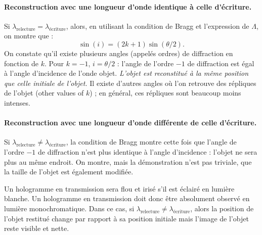 \paragraph{Reconstruction avec une longueur d'onde identique à celle d'écriture.}
Si $\lambda_{\text{relecture}}=\lambda_{\text{écriture}}$, alors, en utilisant
la condition de Bragg et l'expression de $\Lambda$, on montre que :
\begin{equation*}
  \sin(i) = (2k+1)\sin(\theta/2).
\end{equation*}
On constate qu'il existe plusieurs angles (appelés ordres) de diffraction en
fonction de $k$. Pour $k=-1$, $i=\theta/2$ : l'angle de l'ordre $-1$ de
diffraction est égal à l'angle d'incidence de l'onde objet. \emph{L'objet est
reconstitué à la même position que celle initiale de l'objet.} Il existe
d'autres angles où l'on retrouve des répliques de l'objet (other values of
$k$) ; en général, ces répliques sont beaucoup moins intenses.

\paragraph{Reconstruction avec une longueur d'onde différente de celle d'écriture.}
Si $\lambda_{\text{relecture}}\neq\lambda_{\text{écriture}}$, la condition de
Bragg montre cette fois que l'angle de l'ordre $-1$ de diffraction n'est plus
identique à l'angle d'incidence : l'objet ne sera plus au même endroit. On
montre, mais la démonstration n'est pas triviale, que la taille de l'objet est
également modifiée.

\begin{conclusion}
  Un hologramme en transmission sera flou et irisé s'il est éclairé en lumière
  blanche. Un hologramme en transmission doit donc être absolument observé en
  lumière monochromatique. Dans ce cas, si
  $\lambda_{\text{relecture}}\neq\lambda_{\text{écriture}}$, alors la position
  de l'objet restitué change par rapport à sa position initiale mais l'image de
  l'objet reste visible et nette.
\end{conclusion}

